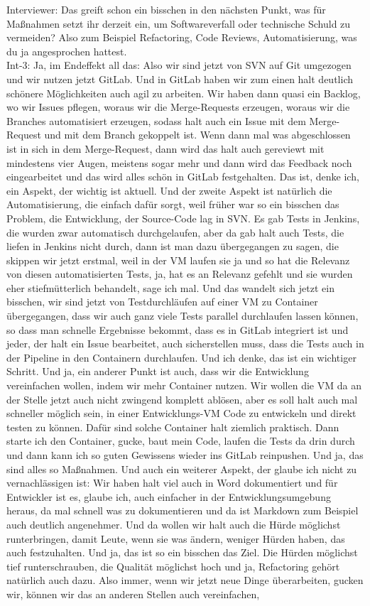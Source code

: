 Interviewer: Das greift schon ein bisschen in den nächsten Punkt, was für Maßnahmen setzt ihr derzeit ein, um Softwareverfall oder technische Schuld zu vermeiden? Also zum Beispiel Refactoring, Code Reviews, Automatisierung, was du ja angesprochen hattest.\\
Int-3: Ja, im Endeffekt all das: Also wir sind jetzt von SVN auf Git umgezogen und wir nutzen jetzt GitLab. Und in GitLab haben wir zum einen halt deutlich schönere Möglichkeiten auch agil zu arbeiten. Wir haben dann quasi ein Backlog, wo wir Issues pflegen, woraus wir die Merge-Requests erzeugen, woraus wir die Branches automatisiert erzeugen, sodass halt auch ein Issue mit dem Merge-Request und mit dem Branch gekoppelt ist. Wenn dann mal was abgeschlossen ist in sich in dem Merge-Request, dann wird das halt auch gereviewt mit mindestens vier Augen, meistens sogar mehr und dann wird das Feedback noch eingearbeitet und das wird alles schön in GitLab festgehalten. Das ist, denke ich, ein Aspekt, der wichtig ist aktuell. Und der zweite Aspekt ist natürlich die Automatisierung, die einfach dafür sorgt, weil früher war so ein bisschen das Problem, die Entwicklung, der Source-Code lag in SVN. Es gab Tests in Jenkins, die wurden zwar automatisch durchgelaufen, aber da gab halt auch Tests, die liefen in Jenkins nicht durch, dann ist man dazu übergegangen zu sagen, die skippen wir jetzt erstmal, weil in der VM laufen sie ja und so hat die Relevanz von diesen automatisierten Tests, ja, hat es an Relevanz gefehlt und sie wurden eher stiefmütterlich behandelt, sage ich mal. Und das wandelt sich jetzt ein bisschen, wir sind jetzt von Testdurchläufen auf einer VM zu Container übergegangen, dass wir auch ganz viele Tests parallel durchlaufen lassen können, so dass man schnelle Ergebnisse bekommt, dass es in GitLab integriert ist und jeder, der halt ein Issue bearbeitet, auch sicherstellen muss, dass die Tests auch in der Pipeline in den Containern durchlaufen. Und ich denke, das ist ein wichtiger Schritt. Und ja, ein anderer Punkt ist auch, dass wir die Entwicklung vereinfachen wollen, indem wir mehr Container nutzen. Wir wollen die VM da an der Stelle jetzt auch nicht zwingend komplett ablösen, aber es soll halt auch mal schneller möglich sein, in einer Entwicklungs-VM Code zu entwickeln und direkt testen zu können. Dafür sind solche Container halt ziemlich praktisch. Dann starte ich den Container, gucke, baut mein Code, laufen die Tests da drin durch und dann kann ich so guten Gewissens wieder ins GitLab reinpushen. Und ja, das sind alles so Maßnahmen. Und auch ein weiterer Aspekt, der glaube ich nicht zu vernachlässigen ist: Wir haben halt viel auch in Word dokumentiert und für Entwickler ist es, glaube ich, auch einfacher in der Entwicklungsumgebung heraus, da mal schnell was zu dokumentieren und da ist Markdown zum Beispiel auch deutlich angenehmer. Und da wollen wir halt auch die Hürde möglichst runterbringen, damit Leute, wenn sie was ändern, weniger Hürden haben, das auch festzuhalten. Und ja, das ist so ein bisschen das Ziel. Die Hürden möglichst tief runterschrauben, die Qualität möglichst hoch und ja, Refactoring gehört natürlich auch dazu. Also immer, wenn wir jetzt neue Dinge überarbeiten, gucken wir, können wir das an anderen Stellen auch vereinfachen, 